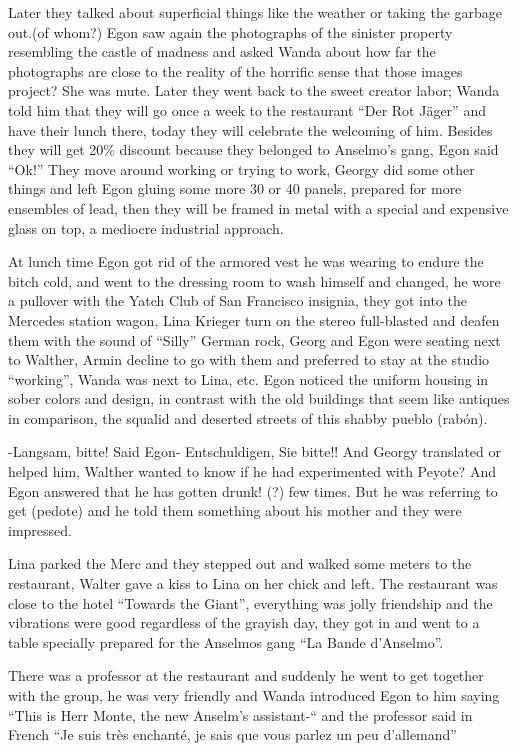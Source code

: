 \documentclass[smalldemyvopaper,11pt,twoside,onecolumn,openright,extrafontsizes]{memoir}
\begin{document}
Later they talked about superficial things like the weather or taking the garbage out.(of whom?) Egon saw again the photographs of the sinister property resembling the castle of madness and asked Wanda about how far the photographs are close to the reality of the horrific sense that those images project? She was mute. Later they went back to the sweet creator labor; Wanda told him that they will go once a week to the restaurant “Der Rot Jäger” and have their lunch there, today they will celebrate the welcoming of him. Besides they will get 20\% discount because they belonged to Anselmo’s gang, Egon said “Ok!” They move around working or trying to work, Georgy did some other things and left Egon gluing some more 30 or 40 panels, prepared for more ensembles of lead, then they will be framed in metal with a special and expensive glass on top, a mediocre industrial approach.

At lunch time Egon got rid of the armored vest he was wearing to endure the bitch cold, and went to the dressing room to wash himself and changed, he wore a pullover with the Yatch Club of San Francisco insignia, they got into the Mercedes station wagon, Lina Krieger turn on the stereo full-blasted and deafen them with the sound of “Silly” German rock, Georg and Egon were seating next to Walther, Armin decline to go with them and preferred to stay at the studio “working”, Wanda was next to Lina, etc. Egon noticed the uniform housing in sober colors and design, in contrast with the old buildings that seem like antiques in comparison, the squalid and deserted streets of this shabby pueblo (rabón).

-Langsam,  bitte! Said Egon- Entschuldigen, Sie bitte!! And Georgy translated or helped him, Walther wanted to know if he had experimented with Peyote? And Egon answered that he has gotten drunk! (?) few times. But he was referring to get (pedote) and he told them something about his mother and they were impressed. 

Lina parked the Merc and they stepped out and walked some meters to the restaurant, Walter gave a kiss to Lina on her chick and left. The restaurant was close to the hotel “Towards the Giant”, everything was jolly friendship and the vibrations were good regardless of the grayish day, they got in and went to a table specially prepared for the Anselmos gang “La Bande d’Anselmo”.

There was a professor at the restaurant and suddenly he went to get together with the group, he was very friendly and Wanda introduced Egon to him saying “This is Herr Monte, the new Anselm’s assistant-“ and the professor said in French “Je suis très enchanté, je sais que vous parlez un peu d’allemand”
\end{document}
